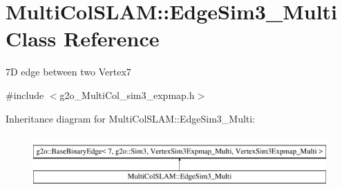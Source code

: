 \hypertarget{classMultiColSLAM_1_1EdgeSim3__Multi}{}\section{Multi\+Col\+S\+L\+AM\+:\+:Edge\+Sim3\+\_\+\+Multi Class Reference}
\label{classMultiColSLAM_1_1EdgeSim3__Multi}


7D edge between two Vertex7  




{\ttfamily \#include $<$g2o\+\_\+\+Multi\+Col\+\_\+sim3\+\_\+expmap.\+h$>$}

Inheritance diagram for Multi\+Col\+S\+L\+AM\+:\+:Edge\+Sim3\+\_\+\+Multi\+:\begin{figure}[H]
\begin{center}
\leavevmode
\includegraphics[height=2.000000cm]{classMultiColSLAM_1_1EdgeSim3__Multi}
\end{center}
\end{figure}
